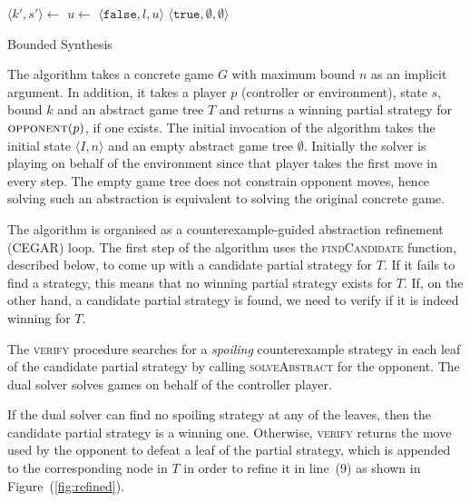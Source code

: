 \documentclass{llncs}
\newcommand{\True}{\texttt{true}}
\newcommand{\False}{\texttt{false}}
\begin{document}
\begin{algorithm}
    \begin{algorithmic}
            \State $\langle k', s'\rangle \gets $  
                \State $u \gets $  
                 \Return $\langle \False, l, u \rangle$ \EndIIf {}
            \EndFor
            \State \Return $\langle \True, \emptyset, \emptyset \rangle$
        \EndFunction
    \end{algorithmic}

    \caption{Bounded Synthesis}
    \label{alg:bounded}
\end{algorithm}

The algorithm takes a concrete game $G$ with maximum bound $n$ as an implicit
argument.  In addition, it takes a player $p$ (controller or environment),
state $s$, bound $k$ and an abstract game tree $T$ and returns a winning
partial strategy for $\textsc{opponent}(p)$, if one exists.  The initial
invocation of the algorithm takes the initial state $\langle I, n\rangle$ and
an empty abstract game tree $\emptyset$.  Initially the solver is playing on
behalf of the environment since that player takes the first move in every step.
The empty game tree does not constrain opponent moves, hence solving such an
abstraction is equivalent to solving the original concrete game.

The algorithm is organised as a counterexample-guided abstraction refinement
(CEGAR) loop.  The first step of the algorithm uses the \textsc{findCandidate}
function, described below, to come up with a candidate partial strategy for
$T$. If it fails to find a strategy, this means that no winning partial
strategy exists for $T$.  If, on the other hand, a candidate partial strategy
is found, we need to verify if it is indeed winning for $T$.

The \textsc{verify} procedure searches for a \emph{spoiling} counterexample
strategy in each leaf of the candidate partial strategy by calling
\textsc{solveAbstract} for the opponent. The dual solver solves games on behalf
of the controller player.  

If the dual solver can find no spoiling strategy at any of the leaves, then the
candidate partial strategy is a winning one. Otherwise, \textsc{verify} returns
the move used by the opponent to defeat a leaf of the partial strategy, which
is appended to the corresponding node in $T$ in order to refine it in line~(9)
as shown in Figure~(\ref{fig:refined}).
\end{document}
